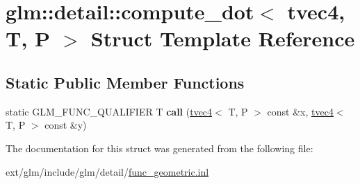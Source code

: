 \hypertarget{structglm_1_1detail_1_1compute__dot_3_01tvec4_00_01_t_00_01_p_01_4}{\section{glm\-:\-:detail\-:\-:compute\-\_\-dot$<$ tvec4, T, P $>$ Struct Template Reference}
\label{structglm_1_1detail_1_1compute__dot_3_01tvec4_00_01_t_00_01_p_01_4}
}
\subsection*{Static Public Member Functions}
\begin{DoxyCompactItemize}
\item 
\hypertarget{structglm_1_1detail_1_1compute__dot_3_01tvec4_00_01_t_00_01_p_01_4_a280557c9f78546e33e4946241c36ee29}{static G\-L\-M\-\_\-\-F\-U\-N\-C\-\_\-\-Q\-U\-A\-L\-I\-F\-I\-E\-R T {\bfseries call} (\hyperlink{structglm_1_1tvec4}{tvec4}$<$ T, P $>$ const \&x, \hyperlink{structglm_1_1tvec4}{tvec4}$<$ T, P $>$ const \&y)}\label{structglm_1_1detail_1_1compute__dot_3_01tvec4_00_01_t_00_01_p_01_4_a280557c9f78546e33e4946241c36ee29}

\end{DoxyCompactItemize}


The documentation for this struct was generated from the following file\-:\begin{DoxyCompactItemize}
\item 
ext/glm/include/glm/detail/\hyperlink{func__geometric_8inl}{func\-\_\-geometric.\-inl}\end{DoxyCompactItemize}
